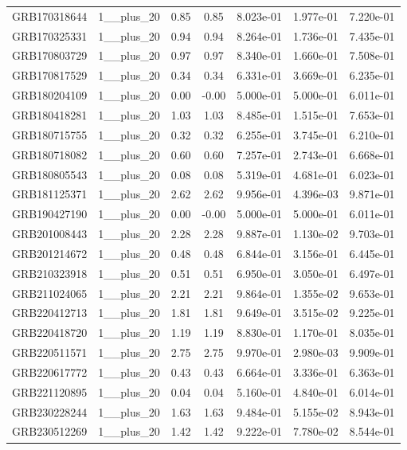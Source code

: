\documentclass[12pt]{article}
\begin{document}
\begin{table}[h!]
{\begin{tabular}{l c c c c c c}
GRB170318644 & 1__plus_20 & 0.85 & 0.85 & 8.023e-01 & 1.977e-01 & 7.220e-01 \\
GRB170325331 & 1__plus_20 & 0.94 & 0.94 & 8.264e-01 & 1.736e-01 & 7.435e-01 \\
GRB170803729 & 1__plus_20 & 0.97 & 0.97 & 8.340e-01 & 1.660e-01 & 7.508e-01 \\
GRB170817529 & 1__plus_20 & 0.34 & 0.34 & 6.331e-01 & 3.669e-01 & 6.235e-01 \\
GRB180204109 & 1__plus_20 & 0.00 & -0.00 & 5.000e-01 & 5.000e-01 & 6.011e-01 \\
GRB180418281 & 1__plus_20 & 1.03 & 1.03 & 8.485e-01 & 1.515e-01 & 7.653e-01 \\
GRB180715755 & 1__plus_20 & 0.32 & 0.32 & 6.255e-01 & 3.745e-01 & 6.210e-01 \\
GRB180718082 & 1__plus_20 & 0.60 & 0.60 & 7.257e-01 & 2.743e-01 & 6.668e-01 \\
GRB180805543 & 1__plus_20 & 0.08 & 0.08 & 5.319e-01 & 4.681e-01 & 6.023e-01 \\
GRB181125371 & 1__plus_20 & 2.62 & 2.62 & 9.956e-01 & 4.396e-03 & 9.871e-01 \\
GRB190427190 & 1__plus_20 & 0.00 & -0.00 & 5.000e-01 & 5.000e-01 & 6.011e-01 \\
GRB201008443 & 1__plus_20 & 2.28 & 2.28 & 9.887e-01 & 1.130e-02 & 9.703e-01 \\
GRB201214672 & 1__plus_20 & 0.48 & 0.48 & 6.844e-01 & 3.156e-01 & 6.445e-01 \\
GRB210323918 & 1__plus_20 & 0.51 & 0.51 & 6.950e-01 & 3.050e-01 & 6.497e-01 \\
GRB211024065 & 1__plus_20 & 2.21 & 2.21 & 9.864e-01 & 1.355e-02 & 9.653e-01 \\
GRB220412713 & 1__plus_20 & 1.81 & 1.81 & 9.649e-01 & 3.515e-02 & 9.225e-01 \\
GRB220418720 & 1__plus_20 & 1.19 & 1.19 & 8.830e-01 & 1.170e-01 & 8.035e-01 \\
GRB220511571 & 1__plus_20 & 2.75 & 2.75 & 9.970e-01 & 2.980e-03 & 9.909e-01 \\
GRB220617772 & 1__plus_20 & 0.43 & 0.43 & 6.664e-01 & 3.336e-01 & 6.363e-01 \\
GRB221120895 & 1__plus_20 & 0.04 & 0.04 & 5.160e-01 & 4.840e-01 & 6.014e-01 \\
GRB230228244 & 1__plus_20 & 1.63 & 1.63 & 9.484e-01 & 5.155e-02 & 8.943e-01 \\
GRB230512269 & 1__plus_20 & 1.42 & 1.42 & 9.222e-01 & 7.780e-02 & 8.544e-01 \\

\end{tabular}}
\end{table}
\end{document}
